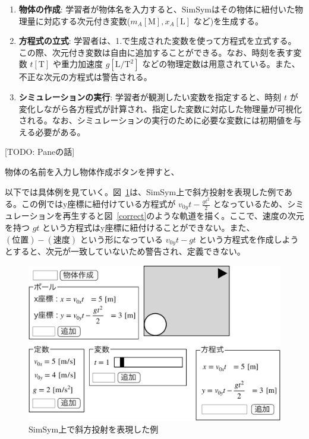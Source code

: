 \documentclass[11pt, a4paper, oneside, twocolumn, dvipdfmx]{jsarticle}
\newcommand{\simname}{SimSym}
\begin{document}
\begin{enumerate}
\item \textbf{物体の作成}: 学習者が物体名を入力すると、\simname はその物体に紐付いた物理量に対応する次元付き変数($m_A\mathrm{[M]}, x_A\mathrm{[L]}$ など)を生成する。
\item \textbf{方程式の立式}: 学習者は、1.で生成された変数を使って方程式を立式する。この際、次元付き変数は自由に追加することができる。なお、時刻を表す変数 $t\mathrm{[T]}$ や重力加速度 $g\mathrm{[L/T^2]}$ などの物理定数は用意されている。また、不正な次元の方程式は警告される。
\item \textbf{シミュレーションの実行}: 学習者が観測したい変数を指定すると、時刻 $t$ が変化しながら各方程式が計算され、指定した変数に対応した物理量が可視化される。なお、シミュレーションの実行のために必要な変数には初期値を与える必要がある。
\end{enumerate}

[TODO: Paneの話]

物体の名前を入力し物体作成ボタンを押すと、

以下では具体例を見ていく。図~\ref{simsym_fig1}は、\simname 上で斜方投射を表現した例である。この例ではy座標に紐付けている方程式が $v_{0y}t - \frac{gt^2}{2}$ となっているため、シミュレーションを再生すると図~\ref{correct}のような軌道を描く。ここで、速度の次元を持つ $gt$ という方程式はy座標に紐付けることができない。また、$(\text{位置}) - (\text{速度})$ という形になっている $v_{0y}t - gt$ という方程式を作成しようとすると、次元が一致していないため警告され、定義できない。

\begin{figure}[htb]
  \centering
  \includegraphics*[width=0.9\linewidth]{work/slide_img4-crop.pdf}
  \caption{\simname 上で斜方投射を表現した例} \label{simsym_fig1}
\end{figure}
\end{document}
